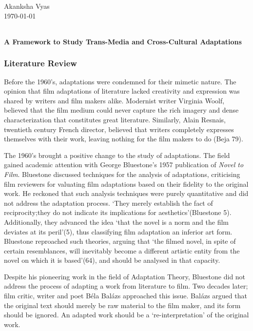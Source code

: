 \documentclass[12pt]{article}
\begin{document}
\begin{flushleft}
Akanksha Vyas\\
\today\\
\end{flushleft}
\begin{center}
\textbf{\large{} \\ \small{A Framework to Study Trans-Media and Cross-Cultural
Adaptations }}
\end{center}

\setlength{\parindent}{0.5in}
\subsubsection*{Literature Review}
Before the 1960's, adaptations were condemned for their mimetic nature. The
opinion that film adaptations of literature lacked creativity and expression
was shared by writers and film makers alike. Modernist writer Virginia Woolf,
believed that the film medium could never capture the rich imagery and dense
characterization that constitutes great literature. Similarly, Alain Resnais,
twentieth century French director, believed that writers completely expresses
themselves with their work, leaving nothing for the film makers to do
(Beja 79).

The 1960's brought a positive change to the study of adaptations. The field
gained academic attention with George Bluestone's 1957 publication of \textit{Novel to Film}. 
Bluestone discussed techniques for the analysis of adaptations, criticising film reviewers for
valuating film adaptations based on their fidelity to the original work. He
reckoned that such analysis techniques were purely quantitative and did not
address the adaptation process. `They merely establish the fact of reciprocity;they
do not indicate its implications for aesthetics'(Bluestone 5). Additionally, they
advanced the idea `that the novel is a norm and the film deviates at its peril'(5), 
thus classifying film adaptation an inferior art form. Bluestone 
reproached such theories, arguing that `the filmed novel, in spite
of certain resemblances, will inevitably become a different artistic entity
   from the novel on which it is based'(64), and should be analysed in that
   capacity.

Despite his pioneering work in the field of Adaptation Theory, Bluestone did not
address the process of adapting a work from literature to film. Two decades
later; film critic, writer and poet B\'{e}la Bal\'{a}zs approached this issue.
Bal\'{a}zs argued that the original text should merely be raw material to the film
maker, and its form should be ignored. An adapted work should be a
`re-interpretation' of the original work. 
\end{document}
